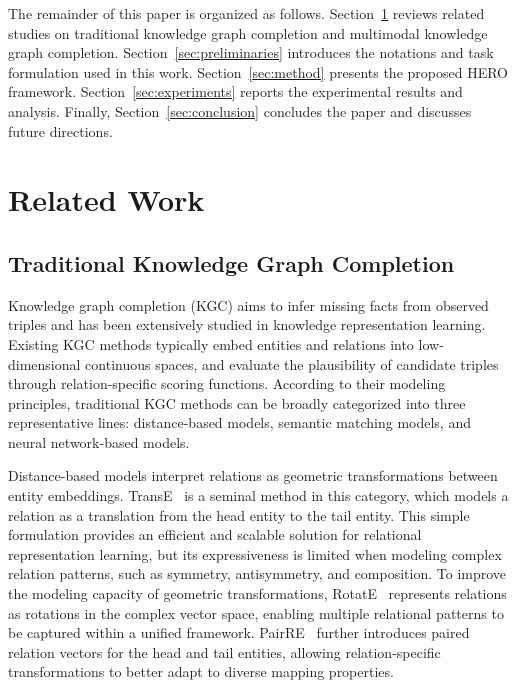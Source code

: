 \documentclass[a4paper,fleqn]{cas-sc}
\begin{document}
The remainder of this paper is organized as follows. Section~\ref{sec:related_work} reviews related studies on traditional knowledge graph completion and multimodal knowledge graph completion. Section~\ref{sec:preliminaries} introduces the notations and task formulation used in this work. Section~\ref{sec:method} presents the proposed HERO framework. Section~\ref{sec:experiments} reports the experimental results and analysis. Finally, Section~\ref{sec:conclusion} concludes the paper and discusses future directions.

\section{Related Work}
\label{sec:related_work}
\subsection{Traditional Knowledge Graph Completion}

Knowledge graph completion (KGC) aims to infer missing facts from observed triples and has been extensively studied in knowledge representation learning. Existing KGC methods typically embed entities and relations into low-dimensional continuous spaces, and evaluate the plausibility of candidate triples through relation-specific scoring functions. According to their modeling principles, traditional KGC methods can be broadly categorized into three representative lines: distance-based models, semantic matching models, and neural network-based models.

Distance-based models interpret relations as geometric transformations between entity embeddings. TransE~\cite{bordes2013transe} is a seminal method in this category, which models a relation as a translation from the head entity to the tail entity. This simple formulation provides an efficient and scalable solution for relational representation learning, but its expressiveness is limited when modeling complex relation patterns, such as symmetry, antisymmetry, and composition. To improve the modeling capacity of geometric transformations, RotatE~\cite{sun2019rotate} represents relations as rotations in the complex vector space, enabling multiple relational patterns to be captured within a unified framework. PairRE~\cite{chao2021pairre} further introduces paired relation vectors for the head and tail entities, allowing relation-specific transformations to better adapt to diverse mapping properties.
\end{document}
